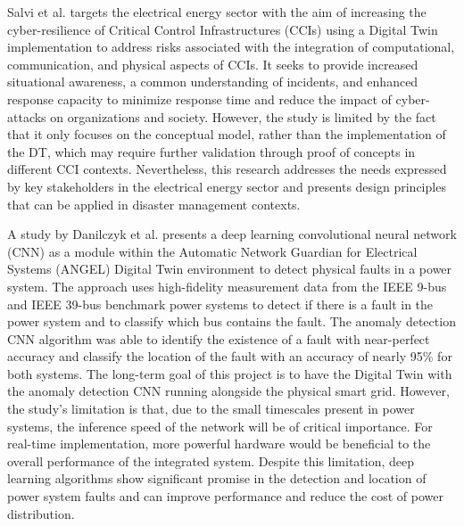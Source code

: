 Salvi et al.\cite{salviCyberresilienceCriticalCyber2022} targets the electrical energy sector with the aim of increasing the cyber-resilience of Critical Control Infrastructures (CCIs) using a Digital Twin implementation to address risks associated with the integration of computational, communication, and physical aspects of CCIs. It seeks to provide increased situational awareness, a common understanding of incidents, and enhanced response capacity to minimize response time and reduce the impact of cyber-attacks on organizations and society. However, the study is limited by the fact that it only focuses on the conceptual model, rather than the implementation of the DT, which may require further validation through proof of concepts in different CCI contexts. Nevertheless, this research addresses the needs expressed by key stakeholders in the electrical energy sector and presents design principles that can be applied in disaster management contexts.


A study by Danilczyk et al.\cite{danilczykSmartGridAnomaly2021} presents a deep learning convolutional neural network (CNN) as a module within the Automatic Network Guardian for Electrical Systems (ANGEL) Digital Twin environment to detect physical faults in a power system. The approach uses high-fidelity measurement data from the IEEE 9-bus and IEEE 39-bus benchmark power systems to detect if there is a fault in the power system and to classify which bus contains the fault. The anomaly detection CNN algorithm was able to identify the existence of a fault with near-perfect accuracy and classify the location of the fault with an accuracy of nearly 95\% for both systems. The long-term goal of this project is to have the Digital Twin with the anomaly detection CNN running alongside the physical smart grid. However, the study's limitation is that, due to the small timescales present in power systems, the inference speed of the network will be of critical importance. For real-time implementation, more powerful hardware would be beneficial to the overall performance of the integrated system. Despite this limitation, deep learning algorithms show significant promise in the detection and location of power system faults and can improve performance and reduce the cost of power distribution.

